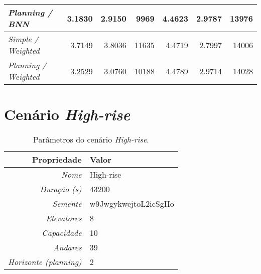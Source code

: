\begin{table}[htb!]
\begin{tabular}{|l|r|r|r|r|r|r|}
\textit{Planning / BNN}           & 3.1830                              & 2.9150                               & 9969                                & \cellcolor[HTML]{67FD9A}4.4623                        & \cellcolor[HTML]{FFFFFF}2.9787                        & \cellcolor[HTML]{67FD9A}13976                        \\ \hline
\textit{Simple / Weighted}        & 3.7149                              & 3.8036                               & 11635                               & 4.4719                                                & \cellcolor[HTML]{67FD9A}2.7997                        & 14006                                                \\ \hline
\textit{Planning / Weighted}      & 3.2529                              & 3.0760                               & 10188                               & 4.4789                                                & 2.9714                                                & 14028                                                \\ \hline
\end{tabular}
\end{table}

\section{Cenário \textit{High-rise}}

\lipsum[1]

\begin{table}[htb!]
\centering
\caption{Parâmetros do cenário \textit{High-rise}.}
\label{tab:results:highrise:params}
\begin{tabular}{|r|l|}
\hline
\textbf{Propriedade}          & \textbf{Valor}       \\ \hline
\textit{Nome}                 & High-rise            \\ \hline
\textit{Duração (s)}          & 43200                \\ \hline
\textit{Semente}              & w9JwgykwejtoL2icSgHo \\ \hline
\textit{Elevatores}           & 8                    \\ \hline
\textit{Capacidade}           & 10                   \\ \hline
\textit{Andares}              & 39                   \\ \hline
\textit{Horizonte (planning)} & 2                    \\ \hline
\end{tabular}
\end{table}


